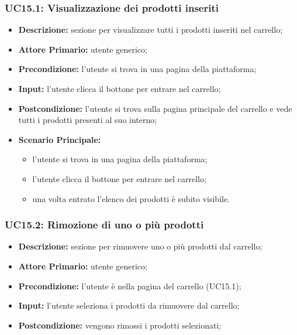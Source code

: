         \subsubsection{UC15.1: Visualizzazione dei prodotti inseriti}
        \begin{itemize}
            \item \textbf{Descrizione:} sezione per visualizzare tutti i prodotti inseriti nel carrello;
            \item \textbf{Attore Primario:} utente generico;
            \item \textbf{Precondizione:}  l'utente si trova in una pagina della piattaforma;
            \item \textbf{Input:} l'utente clicca il bottone per entrare nel carrello;
            \item \textbf{Postcondizione:} l'utente si trova sulla pagina principale del carrello e vede tutti i prodotti presenti al suo interno;
            \item \textbf{Scenario Principale:}
                \begin{itemize}
                    \item l'utente si trova in una pagina della piattaforma;
                    \item l'utente clicca il bottone per entrare nel carrello;
                    \item una volta entrato l'elenco dei prodotti è subito visibile.
                \end{itemize}
        \end{itemize}
        \subsubsection{UC15.2: Rimozione di uno o più prodotti}
        \begin{itemize}
            \item \textbf{Descrizione:} sezione per rimuovere uno o più prodotti dal carrello;
            \item \textbf{Attore Primario:} utente generico;
            \item \textbf{Precondizione:} l'utente è nella pagina del carrello (UC15.1);
            \item \textbf{Input:} l'utente seleziona i prodotti da rimuovere dal carrello;
            \item \textbf{Postcondizione:} vengono rimossi i prodotti selezionati;
        \end{itemize}
